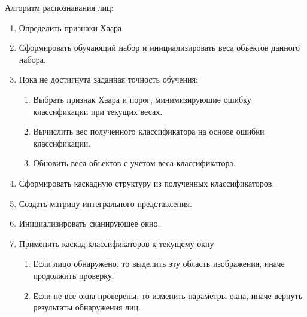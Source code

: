 Алгоритм распознавания лиц:

\begin{enumerate}[label*=\arabic*.]
    \item Определить признаки Хаара.
    \item Сформировать обучающий набор и инициализировать веса объектов данного набора.
    \item Пока не достигнута заданная точность обучения:
    \begin{enumerate}
        \item Выбрать признак Хаара и порог, минимизирующие ошибку классификации при текущих весах.
        \item Вычислить вес полученного классификатора на основе ошибки классификации.
        \item Обновить веса объектов с учетом веса классификатора.
    \end{enumerate}
    \item Сформировать каскадную структуру из полученных классификаторов.
    \item Создать матрицу интегрального представления.
    \item Инициализировать сканирующее окно.
    \item Применить каскад классификаторов к текущему окну.
    \begin{enumerate}
        \item Если лицо обнаружено, то выделить эту область изображения, иначе продолжить проверку.
        \item Если не все окна проверены, то изменить параметры окна, иначе вернуть результаты обнаружения лиц.
    \end{enumerate}
\end{enumerate}
